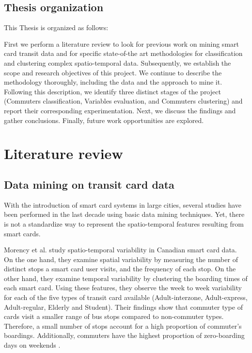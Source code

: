 \documentclass{article}
\begin{document}
\subsection{Thesis organization}
This Thesis is organized as follows:

First we perform a literature review to look for previous work on mining smart card transit data and for specific state-of-the art methodologies for classification and clustering complex spatio-temporal data. Subsequently, we establish the scope and research objectives of this project. We continue to describe the methodology thoroughly, including the data and the approach to mine it. Following this description, we identify three distinct stages of the project (Commuters classification, Variables evaluation, and Commuters clustering) and report their corresponding experimentation. Next, we discuss the findings and gather conclusions. Finally, future work opportunities are explored. 


\newpage
\section{Literature review}

\subsection{Data mining on transit card data}
With the introduction of smart card systems in large cities, several studies have been performed in the last decade using basic data mining techniques. Yet, there is not a standardize way to represent the spatio-temporal features resulting from smart cards. 


Morency et al. study spatio-temporal variability in Canadian smart card data. On the one hand, they examine spatial variability by measuring the number of distinct stops a smart card user visits, and the frequency of each stop. On the other hand, they examine temporal variability by clustering the boarding times of each smart card. Using these features, they observe the week to week variability for each of the five types of transit card available (Adult-interzone, Adult-express, Adult-regular, Elderly and Student). Their findings show that commuter type of cards visit a smaller range of bus stops compared to non-commuter types. Therefore, a small number of stops account for a high proportion of commuter's boardings. Additionally, commuters have the highest proportion of zero-boarding days on weekends \cite{morency2007measuring}.
\end{document}

